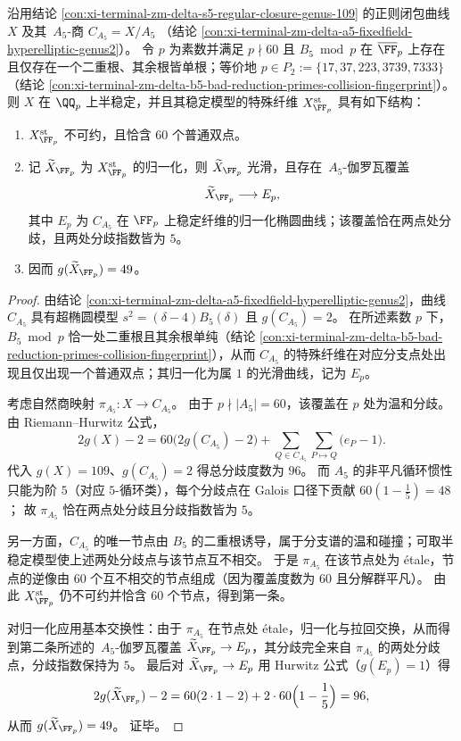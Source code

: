 \begin{theorem}\label{thm:xi-terminal-zm-delta-s5-tame-collision-semistable-fiber}
沿用结论 \ref{con:xi-terminal-zm-delta-s5-regular-closure-genus-109} 的正则闭包曲线 \(X\) 及其 \(\,A_5\)-商
\(
C_{A_5}=X/A_5
\)
（结论 \ref{con:xi-terminal-zm-delta-a5-fixedfield-hyperelliptic-genus2}）。
令 \(p\) 为素数并满足 \(p\nmid 60\) 且 \(B_5\bmod p\) 在 \(\overline{\FF}_p\) 上存在且仅存在一个二重根、其余根皆单根；等价地 \(p\in P_2:=\{17,37,223,3739,7333\}\)（结论 \ref{con:xi-terminal-zm-delta-b5-bad-reduction-primes-collision-fingerprint}）。
则 \(X\) 在 \(\QQ_p\) 上半稳定，并且其稳定模型的特殊纤维 \(X^{\mathrm{st}}_{\FF_p}\) 具有如下结构：
\begin{enumerate}
  \item \(X^{\mathrm{st}}_{\FF_p}\) 不可约，且恰含 \(60\) 个普通双点。
  \item 记 \(\widetilde X_{\FF_p}\) 为 \(X^{\mathrm{st}}_{\FF_p}\) 的归一化，则 \(\widetilde X_{\FF_p}\) 光滑，且存在 \(\,A_5\)-伽罗瓦覆盖
  \[
  \widetilde X_{\FF_p}\longrightarrow E_p,
  \]
  其中 \(E_p\) 为 \(C_{A_5}\) 在 \(\FF_p\) 上稳定纤维的归一化椭圆曲线；该覆盖恰在两点处分歧，且两处分歧指数皆为 \(5\)。
  \item 因而 \(g(\widetilde X_{\FF_p})=49\)。
\end{enumerate}
\end{theorem}
\begin{proof}
由结论 \ref{con:xi-terminal-zm-delta-a5-fixedfield-hyperelliptic-genus2}，曲线 \(C_{A_5}\) 具有超椭圆模型
\(
s^2=(\delta-4)B_5(\delta)
\)
且 \(g(C_{A_5})=2\)。
在所述素数 \(p\) 下，\(B_5\bmod p\) 恰一处二重根且其余根单纯（结论 \ref{con:xi-terminal-zm-delta-b5-bad-reduction-primes-collision-fingerprint}），从而 \(C_{A_5}\) 的特殊纤维在对应分支点处出现且仅出现一个普通双点；其归一化为属 \(1\) 的光滑曲线，记为 \(E_p\)。
\par
考虑自然商映射 \(\pi_{A_5}:X\to C_{A_5}\)。
由于 \(p\nmid |A_5|=60\)，该覆盖在 \(p\) 处为温和分歧。
由 Riemann--Hurwitz 公式，
\[
2g(X)-2
=60\bigl(2g(C_{A_5})-2\bigr)+\sum_{Q\in C_{A_5}}\sum_{P\mapsto Q}\bigl(e_P-1\bigr).
\]
代入 \(g(X)=109\)、\(g(C_{A_5})=2\) 得总分歧度数为 \(96\)。
而 \(A_5\) 的非平凡循环惯性只能为阶 \(5\)（对应 \(5\)-循环类），每个分歧点在 Galois 口径下贡献
\(
60(1-\frac15)=48
\)；
故 \(\pi_{A_5}\) 恰在两点处分歧且分歧指数皆为 \(5\)。
\par
另一方面，\(C_{A_5}\) 的唯一节点由 \(B_5\) 的二重根诱导，属于分支谱的温和碰撞；可取半稳定模型使上述两处分歧点与该节点互不相交。
于是 \(\pi_{A_5}\) 在该节点处为 \'etale，节点的逆像由 \(60\) 个互不相交的节点组成（因为覆盖度数为 \(60\) 且分解群平凡）。
由此 \(X^{\mathrm{st}}_{\FF_p}\) 仍不可约并恰含 \(60\) 个节点，得到第一条。
\par
对归一化应用基本交换性：由于 \(\pi_{A_5}\) 在节点处 \'etale，归一化与拉回交换，从而得到第二条所述的 \(\,A_5\)-伽罗瓦覆盖 \(\widetilde X_{\FF_p}\to E_p\)，其分歧完全来自 \(\pi_{A_5}\) 的两处分歧点，分歧指数保持为 \(5\)。
最后对 \(\widetilde X_{\FF_p}\to E_p\) 用 Hurwitz 公式（\(g(E_p)=1\)）得
\[
2g(\widetilde X_{\FF_p})-2
=60(2\cdot 1-2)+2\cdot 60\Bigl(1-\frac15\Bigr)
=96,
\]
从而 \(g(\widetilde X_{\FF_p})=49\)。
证毕。
\end{proof}

